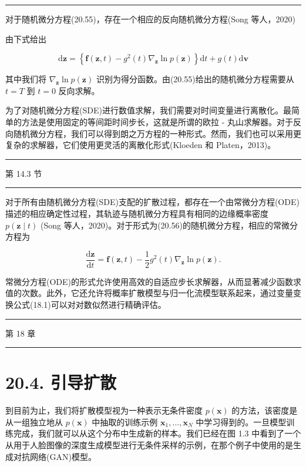 \documentclass[10pt]{article}
\newcommand{\HRule}{\begin{center}\rule{0.9\linewidth}{0.2mm}\end{center}}
\begin{document}
\HRule

对于随机微分方程(20.55)，存在一个相应的反向随机微分方程(Song 等人，2020)

由下式给出

\[
\mathrm{d}\mathbf{z} = \left\{  {\mathbf{f}\left( {\mathbf{z},t}\right)  - {g}^{2}\left( t\right) {\nabla }_{\mathbf{z}}\ln p\left( \mathbf{z}\right) }\right\}  \mathrm{d}t + g\left( t\right) \mathrm{d}\mathbf{v} \tag{20.56}
\]

其中我们将 \({\nabla }_{\mathbf{z}}\ln p\left( \mathbf{z}\right)\) 识别为得分函数。由(20.55)给出的随机微分方程需要从 \(t = T\) 到 \(t = 0\) 反向求解。

为了对随机微分方程(SDE)进行数值求解，我们需要对时间变量进行离散化。最简单的方法是使用固定的等间距时间步长，这就是所谓的欧拉 - 丸山求解器。对于反向随机微分方程，我们可以得到朗之万方程的一种形式。然而，我们也可以采用更复杂的求解器，它们使用更灵活的离散化形式(Kloeden 和 Platen，2013)。

\HRule

第 14.3 节

\HRule

对于所有由随机微分方程(SDE)支配的扩散过程，都存在一个由常微分方程(ODE)描述的相应确定性过程，其轨迹与随机微分方程具有相同的边缘概率密度 \(p\left( {\mathbf{z} \mid  t}\right)\) (Song 等人，2020)。对于形式为(20.56)的随机微分方程，相应的常微分方程为

\[
\frac{\mathrm{d}\mathbf{z}}{\mathrm{d}t} = \mathbf{f}\left( {\mathbf{z},t}\right)  - \frac{1}{2}{g}^{2}\left( t\right) {\nabla }_{\mathbf{z}}\ln p\left( \mathbf{z}\right) . \tag{20.57}
\]

常微分方程(ODE)的形式允许使用高效的自适应步长求解器，从而显著减少函数求值的次数。此外，它还允许将概率扩散模型与归一化流模型联系起来，通过变量变换公式(18.1)可以对对数似然进行精确评估。

\HRule

第 18 章

\HRule

\section*{20.4. 引导扩散}

到目前为止，我们将扩散模型视为一种表示无条件密度 \(p\left( \mathbf{x}\right)\) 的方法，该密度是从一组独立地从 \(p\left( \mathbf{x}\right)\) 中抽取的训练示例 \({\mathbf{x}}_{1},\ldots ,{\mathbf{x}}_{N}\) 中学习得到的。一旦模型训练完成，我们就可以从这个分布中生成新的样本。我们已经在图 1.3 中看到了一个从用于人脸图像的深度生成模型进行无条件采样的示例，在那个例子中使用的是生成对抗网络(GAN)模型。
\end{document}
